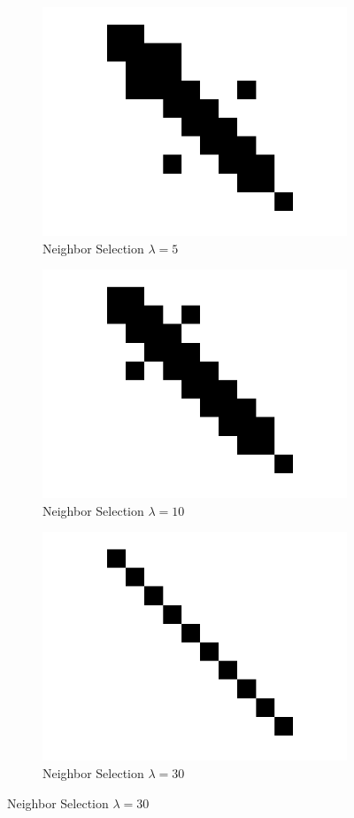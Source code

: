 \documentclass{article}
\begin{document}
\begin{enumerate}
\begin{figure}[ht!]
\begin{subfigure}{.5\textwidth}
  \centering
  \includegraphics[width=.8\linewidth]{ns_5.png}
  \caption{Neighbor Selection $\lambda=5$}
\end{subfigure}%
\begin{subfigure}{.5\textwidth}
  \centering
  \includegraphics[width=.8\linewidth]{ns_10.png}
  \caption{Neighbor Selection $\lambda=10$}
\end{subfigure}

\begin{subfigure}{.5\textwidth}
  \centering
  \includegraphics[width=.8\linewidth]{ns_30.png}
  \caption{Neighbor Selection $\lambda=30$}
\end{subfigure}%



\end{figure}
\end{enumerate}
\end{document}
